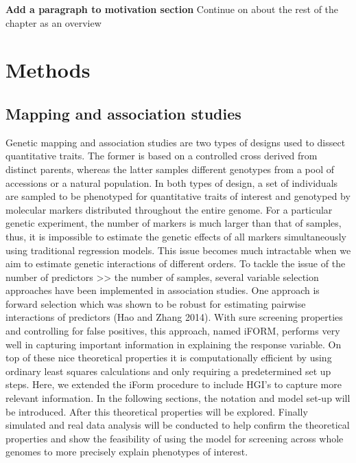 \documentclass[]{book}
\theoremstyle{definition}
\theoremstyle{definition}
\theoremstyle{remark}
\begin{document}
\textbf{Add a paragraph to motivation section} Continue on about the
rest of the chapter as an overview

\section{Methods}\label{methods-1}

\subsection{Mapping and association
studies}\label{mapping-and-association-studies}

Genetic mapping and association studies are two types of designs used to
dissect quantitative traits. The former is based on a controlled cross
derived from distinct parents, whereas the latter samples different
genotypes from a pool of accessions or a natural population. In both
types of design, a set of individuals are sampled to be phenotyped for
quantitative traits of interest and genotyped by molecular markers
distributed throughout the entire genome. For a particular genetic
experiment, the number of markers is much larger than that of samples,
thus, it is impossible to estimate the genetic effects of all markers
simultaneously using traditional regression models. This issue becomes
much intractable when we aim to estimate genetic interactions of
different orders. To tackle the issue of the number of predictors
\textgreater{}\textgreater{} the number of samples, several variable
selection approaches have been implemented in association studies. One
approach is forward selection which was shown to be robust for
estimating pairwise interactions of predictors (Hao and Zhang 2014).
With sure screening properties and controlling for false positives, this
approach, named iFORM, performs very well in capturing important
information in explaining the response variable. On top of these nice
theoretical properties it is computationally efficient by using ordinary
least squares calculations and only requiring a predetermined set up
steps. Here, we extended the iForm procedure to include HGI's to capture
more relevant information. In the following sections, the notation and
model set-up will be introduced. After this theoretical properties will
be explored. Finally simulated and real data analysis will be conducted
to help confirm the theoretical properties and show the feasibility of
using the model for screening across whole genomes to more precisely
explain phenotypes of interest.
\end{document}
